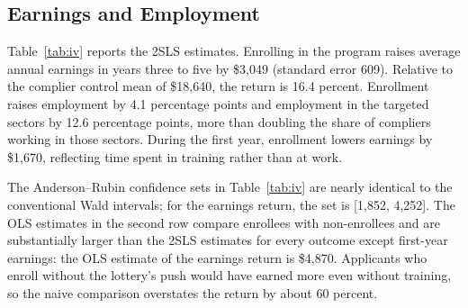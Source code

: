 \documentclass[12pt]{article}
\begin{document}
\subsection{Earnings and Employment}

Table~\ref{tab:iv} reports the 2SLS estimates. Enrolling in the program raises average annual earnings in years three to five by \$3,049 (standard error 609). Relative to the complier control mean of \$18,640, the return is 16.4 percent. Enrollment raises employment by 4.1 percentage points and employment in the targeted sectors by 12.6 percentage points, more than doubling the share of compliers working in those sectors. During the first year, enrollment lowers earnings by \$1,670, reflecting time spent in training rather than at work.

The Anderson--Rubin confidence sets in Table~\ref{tab:iv} are nearly identical to the conventional Wald intervals; for the earnings return, the set is [1,852, 4,252]. The OLS estimates in the second row compare enrollees with non-enrollees and are substantially larger than the 2SLS estimates for every outcome except first-year earnings: the OLS estimate of the earnings return is \$4,870. Applicants who enroll without the lottery's push would have earned more even without training, so the naive comparison overstates the return by about 60 percent.
\end{document}
